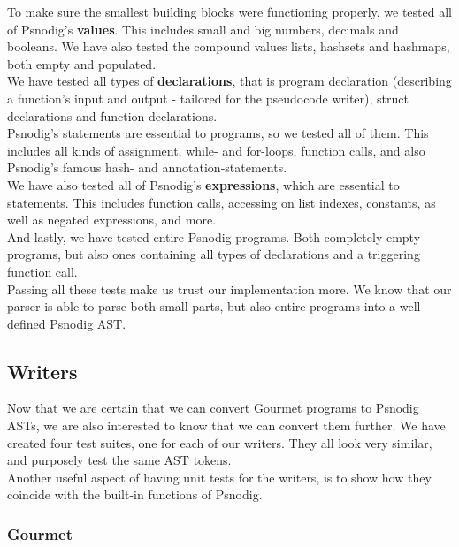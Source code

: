 To make sure the smallest building blocks were functioning properly, we tested all of Psnodig's \textbf{values}. This includes small and big numbers, decimals and booleans. We have also tested the compound values lists, hashsets and hashmaps, both empty and populated. \\

We have tested all types of \textbf{declarations}, that is program declaration (describing a function's input and output - tailored for the pseudocode writer), struct declarations and function declarations. \\

Psnodig's statements are essential to programs, so we tested all of them. This includes all kinds of assignment, while- and for-loops, function calls, and also Psnodig's famous hash- and annotation-statements. \\

We have also tested all of Psnodig's \textbf{expressions}, which are essential to statements. This includes function calls, accessing on list indexes, constants, as well as negated expressions, and more. \\

And lastly, we have tested entire Psnodig programs. Both completely empty programs, but also ones containing all types of declarations and a triggering function call. \\

Passing all these tests make us trust our implementation more. We know that our parser is able to parse both small parts, but also entire programs into a well-defined Psnodig AST.

\subsection{Writers}

Now that we are certain that we can convert Gourmet programs to Psnodig ASTs, we are also interested to know that we can convert them further. We have created four test suites, one for each of our writers. They all look very similar, and purposely test the same AST tokens. \\

Another useful aspect of having unit tests for the writers, is to show how they coincide with the built-in functions of Psnodig.

\subsubsection{Gourmet}

